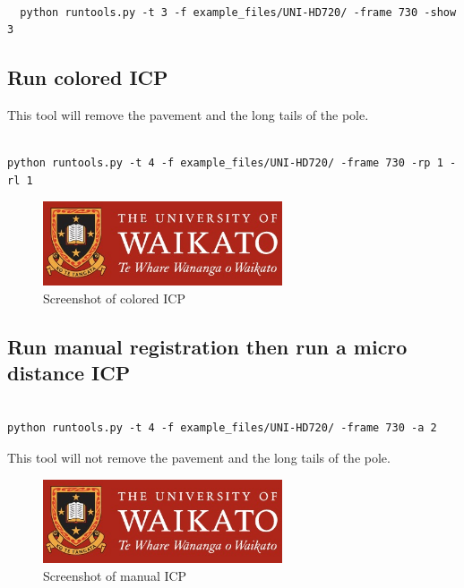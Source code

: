 \begin{lstlisting}

  python runtools.py -t 3 -f example_files/UNI-HD720/ -frame 730 -show 3

\end{lstlisting}

\subsection{Run colored ICP}

This tool will remove the pavement and the long tails of the pole.

\begin{lstlisting}

python runtools.py -t 4 -f example_files/UNI-HD720/ -frame 730 -rp 1 -rl 1

\end{lstlisting}

\begin{figure}[!ht]
  \centerline{\includegraphics[width=200pt]{images/UoW.jpg}}
  \caption{Screenshot of colored ICP }
  \label{fig311}
\end{figure}

\subsection{Run manual registration then run a micro distance ICP}

\begin{lstlisting}

python runtools.py -t 4 -f example_files/UNI-HD720/ -frame 730 -a 2

\end{lstlisting}

This tool will not remove the pavement and the long tails of the pole. 

\begin{figure}[htbp]
  \centerline{\includegraphics[width=200pt]{images/UoW.jpg}}
  \caption{Screenshot of manual ICP }
  \label{fig312}
\end{figure}

